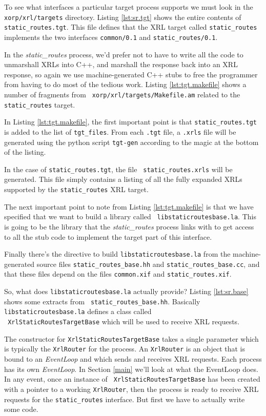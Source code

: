\documentclass[11pt]{article}
\newcommand{\stt}{\tt\small}
\newcommand{\SR}{{\tt\small static\_routes}\xspace}
\newcommand{\SRI}{{\it static\_routes}\xspace}
\begin{document}
\vspace{0.1in}
To see what interfaces a particular target process supports we must
look in the {\stt xorp/xrl/targets} directory.  Listing
\ref{lst:sr.tgt} shows the entire contents of {\stt
static\_routes.tgt}.
This file defines that the XRL target called \SR implements the two
interfaces {\stt common/0.1} and {\stt static\_routes/0.1}.

In the \SRI process, we'd prefer not to have to write all the code to
unmarshall XRLs into C++, and marshall the response back into an XRL
response, so again we use machine-generated C++ stubs to free the
programmer from having to do most of the tedious work.  Listing
\ref{lst:tgt.makefile} shows a number of fragments from {\stt
xorp/xrl/targets/Makefile.am} related to the {\stt static\_routes}
target.


In Listing \ref{lst:tgt.makefile}, the first important point is that
{\stt static\_routes.tgt} is added to the list of {\stt tgt\_files}.
From each {\stt .tgt} file, a {\stt .xrls} file will be generated
using the python script {\stt tgt-gen} according to the magic at the
bottom of the listing.

In the case of {\stt static\_routes.tgt}, the file {\stt
static\_routes.xrls} will be generated.  This file simply contains a
listing of all the fully expanded XRLs supported by the \SR XRL
target.

The next important point to note from Listing \ref{lst:tgt.makefile}
is that we have specified that we want to build a library called {\stt
libstaticroutesbase.la}.  This is going to be the library that the \SRI
process links with to get access to all the stub code to implement
the target part of this interface.

Finally there's the directive to build {\stt libstaticroutesbase.la}
from the machine-generated source files {\stt static\_routes\_base.hh}
and {\stt static\_routes\_base.cc}, and that these files depend on the
files {\stt common.xif} and {\stt static\_routes.xif}.

\vspace{0.1in}
So, what does {\stt libstaticroutesbase.la} actually provide?  Listing
\ref{lst:sr.base} shows some extracts from {\stt
static\_routes\_base.hh}.
Basically {\stt libstaticroutesbase.la} defines a class called \\
{\stt
XrlStaticRoutesTargetBase} which will be used to receive XRL requests.

The constructor for {\stt XrlStaticRoutesTargetBase} takes a single
parameter which is typically the {\stt XrlRouter} for the process.  An
{\stt XrlRouter} is an object that is bound to an {\it EventLoop} and
which sends and receives XRL requests.  Each process has its own {\it
EventLoop}.  In Section \ref{main} we'll look at what the EventLoop
does.  In any event, once an instance of {\stt
XrlStaticRoutesTargetBase} has been created with a pointer to a
working {\stt XrlRouter}, then the process is ready to receive XRL
requests for the \SR interface.  But first we have to actually write
some code.
\end{document}
